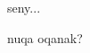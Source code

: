 \noindent
seny...

nuqa oqanak?


\section*{}
\section*{}
\section*{}
\section*{}
\section*{}
\section*{}
\section*{}
\section*{}
\section*{}
\section*{}

\section*{}
\section*{}
\section*{}
\section*{}
\section*{}
